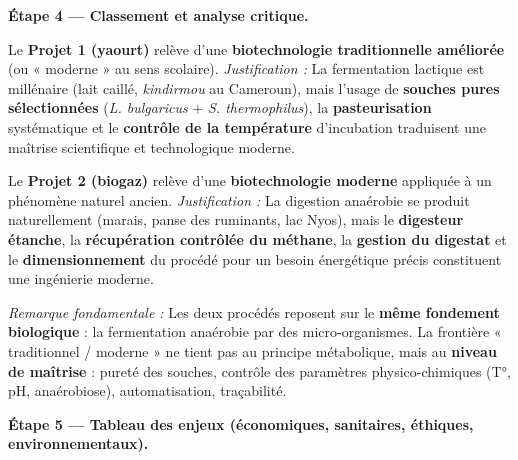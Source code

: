 \documentclass[11pt]{article}
\begin{document}
\begin{exoresolu}
\textbf{Étape 4 — Classement et analyse critique.}

\begin{aretenir}
Le \textbf{Projet 1 (yaourt)} relève d'une \textbf{biotechnologie traditionnelle améliorée} (ou « moderne » au sens scolaire). \emph{Justification :} La fermentation lactique est millénaire (lait caillé, \emph{kindirmou} au Cameroun), mais l'usage de \textbf{souches pures sélectionnées} (\emph{L. bulgaricus} + \emph{S. thermophilus}), la \textbf{pasteurisation} systématique et le \textbf{contrôle de la température} d'incubation traduisent une maîtrise scientifique et technologique moderne.

Le \textbf{Projet 2 (biogaz)} relève d'une \textbf{biotechnologie moderne} appliquée à un phénomène naturel ancien. \emph{Justification :} La digestion anaérobie se produit naturellement (marais, panse des ruminants, lac Nyos), mais le \textbf{digesteur étanche}, la \textbf{récupération contrôlée du méthane}, la \textbf{gestion du digestat} et le \textbf{dimensionnement} du procédé pour un besoin énergétique précis constituent une ingénierie moderne.

\emph{Remarque fondamentale :} Les deux procédés reposent sur le \textbf{même fondement biologique} : la fermentation anaérobie par des micro-organismes. La frontière « traditionnel / moderne » ne tient pas au principe métabolique, mais au \textbf{niveau de maîtrise} : pureté des souches, contrôle des paramètres physico-chimiques (T°, pH, anaérobiose), automatisation, traçabilité.
\end{aretenir}

\textbf{Étape 5 — Tableau des enjeux (économiques, sanitaires, éthiques, environnementaux).}


\end{exoresolu}
\end{document}
